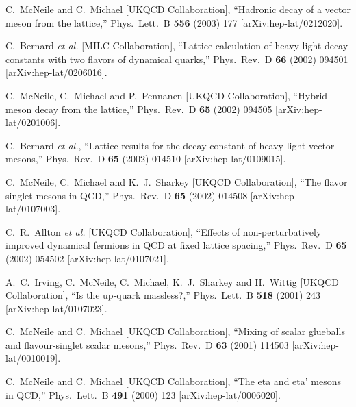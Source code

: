 \begin{thebibliography}{130}
C.~McNeile and C.~Michael  [UKQCD Collaboration],
``Hadronic decay of a vector meson from the lattice,''
Phys.\ Lett.\ B {\bf 556} (2003) 177
[arXiv:hep-lat/0212020].


C.~Bernard {\it et al.}  [MILC Collaboration],
``Lattice calculation of heavy-light decay constants with two flavors
of  dynamical quarks,''
Phys.\ Rev.\ D {\bf 66} (2002) 094501
[arXiv:hep-lat/0206016].



C.~McNeile, C.~Michael and P.~Pennanen  [UKQCD Collaboration],
``Hybrid meson decay from the lattice,''
Phys.\ Rev.\ D {\bf 65} (2002) 094505
[arXiv:hep-lat/0201006].


C.~Bernard {\it et al.},
``Lattice results for the decay constant of heavy-light vector
mesons,''
Phys.\ Rev.\ D {\bf 65} (2002) 014510
[arXiv:hep-lat/0109015].


C.~McNeile, C.~Michael and K.~J.~Sharkey  [UKQCD Collaboration],
``The flavor singlet mesons in QCD,''
Phys.\ Rev.\ D {\bf 65} (2002) 014508
[arXiv:hep-lat/0107003].


C.~R.~Allton {\it et al.}  [UKQCD Collaboration],
``Effects of non-perturbatively improved dynamical fermions in QCD at
 fixed lattice spacing,''
Phys.\ Rev.\ D {\bf 65} (2002) 054502
[arXiv:hep-lat/0107021].


A.~C.~Irving, C.~McNeile, C.~Michael, K.~J.~Sharkey and H.~Wittig  [UKQCD
                  Collaboration],
``Is the up-quark massless?,''
Phys.\ Lett.\ B {\bf 518} (2001) 243
[arXiv:hep-lat/0107023].



C.~McNeile and C.~Michael  [UKQCD Collaboration],
``Mixing of scalar glueballs and flavour-singlet scalar mesons,''
Phys.\ Rev.\ D {\bf 63} (2001) 114503
[arXiv:hep-lat/0010019].


C.~McNeile and C.~Michael  [UKQCD Collaboration],
``The eta and eta' mesons in QCD,''
Phys.\ Lett.\ B {\bf 491} (2000) 123
[arXiv:hep-lat/0006020].



\end{thebibliography}
